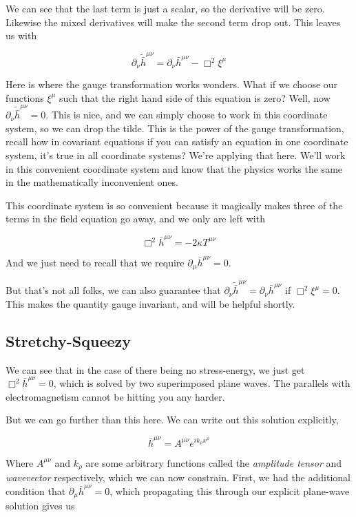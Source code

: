 \documentclass{article}
\newcommand{\umn}{^{\mu\nu}}
\newcommand{\p}{\partial}
\begin{document}
We can see that the last term is just a scalar, so the derivative will be zero. Likewise the mixed derivatives will make the second term drop out. This leaves us with

\begin{equation}
    \p_\nu \tilde{\bar{h}}\umn = \p_\nu\bar{h}\umn - \Box^2\xi^\mu
\end{equation}

Here is where the gauge transformation works wonders. What if we choose our functions $\xi^\mu$ such that the right hand side of this equation is zero? Well, now $\p_\nu \tilde{\bar{h}}\umn = 0$. This is nice, and we can simply choose to work in this coordinate system, so we can drop the tilde. This is the power of the gauge transformation, recall how in covariant equations if you can satisfy an equation in one coordinate system, it's true in all coordinate systems? We're applying that here. We'll work in this convenient coordinate system and know that the physics works the same in the mathematically inconvenient ones.

This coordinate system is so convenient because it magically makes three of the terms in the field equation go away, and we only are left with

\begin{equation}
    \Box^2\bar{h}\umn = -2\kappa T\umn
\end{equation}

And we just need to recall that we require $\p_\mu\bar{h}\umn=0$.

But that's not all folks, we can also guarantee that $\p_\nu \tilde{\bar{h}}\umn = \p_\nu\bar{h}\umn$ if $\Box^2\xi^\mu=0$. This makes the quantity gauge invariant, and will be helpful shortly.

\subsection{Stretchy-Squeezy}
We can see that in the case of there being no stress-energy, we just get $\Box^2\bar{h}\umn = 0$, which is solved by two superimposed plane waves. The parallels with electromagnetism cannot be hitting you any harder.

But we can go further than this here. We can write out this solution explicitly,

\begin{equation}
    \bar{h}\umn = A\umn e^{ik_\rho x^\rho}
\end{equation}

Where $A\umn$ and $k_\rho$ are some arbitrary functions called the \textit{amplitude tensor} and \textit{wavevector} respectively, which we can now constrain. First, we had the additional condition that $\p_\mu\bar{h}\umn=0$, which propagating this through our explicit plane-wave solution gives us
\end{document}
